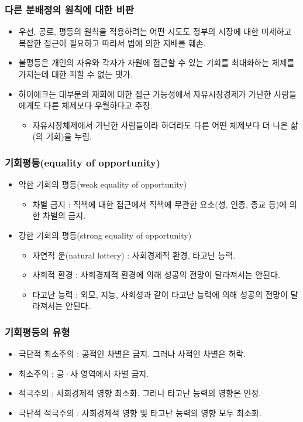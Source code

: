 \documentclass[aspectratio=169,xcolor=dvipsnames,handout]{beamer}
\begin{document}
\begin{frame}[<+->]
\frametitle{다른 분배정의 원칙에 대한 비판}
    \begin{itemize}
        \item 우선, 공로, 평등의 원칙을 적용하려는 어떤 시도도 정부의 시장에 대한 미세하고 복잡한 접근이 필요하고 따라서 법에 의한 지배를 훼손.
        \item 불평등은 개인의 자유와 각자가 자원에 접근할 수 있는 기회를 최대화하는 체제를 가지는데 대한 피할 수 없는 댓가.
        \item 하이에크는 대부분의 재회에 대한 접근 가능성에서 자유시장경제가 가난한 사람들에게도 다른 체제보다 우월하다고 주장.
        \begin{itemize}
            \item  자유시장체제에서 가난한 사람들이라 하더라도 다른 어떤 체제보다 더 나은 삶(의 기회)을 누림.
        \end{itemize}
    \end{itemize}
\end{frame}

\begin{frame}[<+->]
\frametitle{기회평등(equality of opportunity)}
    \begin{itemize}
        \item 약한 기회의 평등(weak equality of opportunity)
        \begin{itemize}
            \item 차별 금지 : 직책에 대한 접근에서 직책에 무관한 요소(성, 인종, 종교 등)에 의한 차별의 금지.
        \end{itemize}
        \item 강한 기회의 평등(strong equality of opportunity)
        \begin{itemize}
            \item 자연적 운(natural lottery) : 사회경제적 환경, 타고난 능력.
            \item 사회적 환경 : 사회경제적 환경에 의해 성공의 전망이 달라져서는 안된다.
            \item 타고난 능력 : 외모, 지능, 사회성과 같이 타고난 능력에 의해 성공의 전망이 달라져서는 안된다.
        \end{itemize}
    \end{itemize}
\end{frame}

\begin{frame}[<+->]
\frametitle{기회평등의 유형}
    \begin{itemize}
        \item 극단적 최소주의 : 공적인 차별은 금지. 그러나 사적인 차별은 허락. 
        \item 최소주의 : 공·사 영역에서 차별 금지.
        \item 적극주의 : 사회경제적 영향 최소화. 그러나 타고난 능력의 영향은 인정.
        \item 극단적 적극주의 : 사회경제적 영향 및 타고난 능력의 영향 모두 최소화.
    \end{itemize}
\end{frame}
\end{document}
